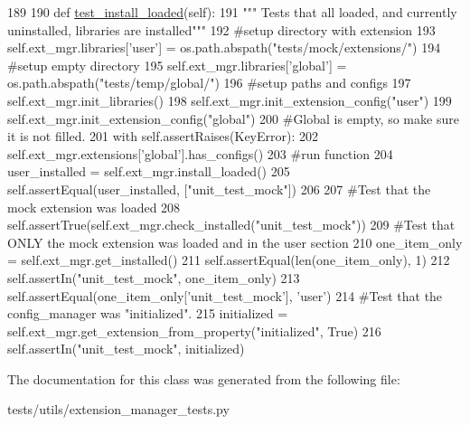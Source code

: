 \begin{DoxyCode}
189 
190     \textcolor{keyword}{def }\hyperlink{classtests_1_1utils_1_1extension__manager__tests_1_1ExtensionLibraries_a73dd723752e59cf02a86230335645e52}{test\_install\_loaded}(self):
191         \textcolor{stringliteral}{""" Tests that all loaded, and currently uninstalled, libraries are installed"""}
192         \textcolor{comment}{#setup directory with extension}
193         self.ext\_mgr.libraries[\textcolor{stringliteral}{'user'}] = os.path.abspath(\textcolor{stringliteral}{"tests/mock/extensions/"})
194         \textcolor{comment}{#setup empty directory}
195         self.ext\_mgr.libraries[\textcolor{stringliteral}{'global'}] = os.path.abspath(\textcolor{stringliteral}{"tests/temp/global/"})
196         \textcolor{comment}{#setup paths and configs}
197         self.ext\_mgr.init\_libraries()
198         self.ext\_mgr.init\_extension\_config(\textcolor{stringliteral}{"user"})
199         self.ext\_mgr.init\_extension\_config(\textcolor{stringliteral}{"global"})
200         \textcolor{comment}{#Global is empty, so make sure it is not filled.}
201         with self.assertRaises(KeyError):
202             self.ext\_mgr.extensions[\textcolor{stringliteral}{'global'}].has\_configs()
203         \textcolor{comment}{#run function}
204         user\_installed = self.ext\_mgr.install\_loaded()
205         self.assertEqual(user\_installed, [\textcolor{stringliteral}{"unit\_test\_mock"}])
206 
207         \textcolor{comment}{#Test that the mock extension was loaded}
208         self.assertTrue(self.ext\_mgr.check\_installed(\textcolor{stringliteral}{"unit\_test\_mock"}))
209         \textcolor{comment}{#Test that ONLY the mock extension was loaded and in the user section}
210         one\_item\_only = self.ext\_mgr.get\_installed()
211         self.assertEqual(len(one\_item\_only), 1)
212         self.assertIn(\textcolor{stringliteral}{"unit\_test\_mock"}, one\_item\_only)
213         self.assertEqual(one\_item\_only[\textcolor{stringliteral}{'unit\_test\_mock'}], \textcolor{stringliteral}{'user'})
214         \textcolor{comment}{#Test that the config\_manager was "initialized".}
215         initialized = self.ext\_mgr.get\_extension\_from\_property(\textcolor{stringliteral}{"initialized"}, \textcolor{keyword}{True})
216         self.assertIn(\textcolor{stringliteral}{"unit\_test\_mock"}, initialized)

\end{DoxyCode}


The documentation for this class was generated from the following file\+:\begin{DoxyCompactItemize}
\item 
tests/utils/extension\+\_\+manager\+\_\+tests.\+py\end{DoxyCompactItemize}
